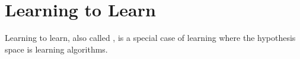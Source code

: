 








\section{Learning to Learn}%

Learning to learn, also called , is a special case of learning where the hypothesis space is learning algorithms. 

